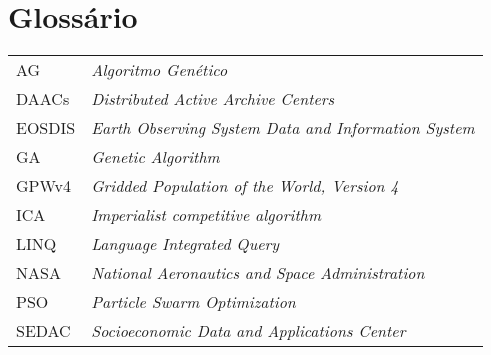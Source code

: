 \chapter*{Glossário}

\begin{tabular}{l p{}}
  AG & \emph{Algoritmo Genético} \\
  DAACs & \emph{Distributed Active Archive Centers} \\
  EOSDIS & \emph{Earth Observing System Data and Information System} \\
  GA & \emph{Genetic Algorithm} \\
  GPWv4 & \emph{Gridded Population of the World, Version 4} \\
  ICA & \emph{Imperialist competitive algorithm} \\
  LINQ & \emph{Language Integrated Query} \\
  NASA & \emph{National Aeronautics and Space Administration} \\
  PSO & \emph{Particle Swarm Optimization} \\
  SEDAC & \emph{Socioeconomic Data and Applications Center} \\
  
\end{tabular}
